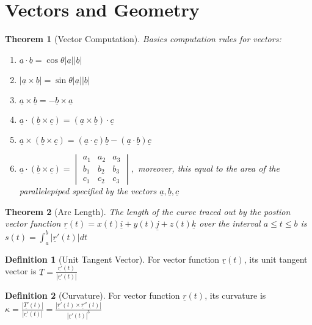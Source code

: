 \documentclass[9pt]{article}
\newtheorem{theorem}{Theorem}[subsection]
\theoremstyle{definition}
\newtheorem{definition}{Definition}[section]
\theoremstyle{remark}
\begin{document}
\section{Vectors and Geometry}

\begin{theorem}[Vector Computation]
Basics computation rules for vectors:
	\begin{enumerate}
		\item $\underline{a} \cdot \underline{b} = \cos{\theta}  | \underline{a}| | \underline{b}| $
		\item $| \underline{a} \times \underline{b} | = \sin{\theta}  | \underline{a}| | \underline{b}| $
		\item $ \underline{a} \times \underline{b} = - \underline{b} \times \underline{a} $
		\item $ \underline{a} \cdot (\underline{b} \times \underline{c}) = ( \underline{a}\times \underline{b}) \cdot \underline{c} $
		\item $ \underline{a} \times (\underline{b} \times \underline{c}) = (\underline{a} \cdot \underline{c}) \underline{b} - (\underline{a} \cdot \underline{b}) \underline{c} $
		\item $ \underline{a} \cdot ( \underline{b} \times \underline{c}) = \begin{vmatrix}
			a_1 & a_2 & a_3 \\
			b_1 & b_2 & b_3 \\
			c_1 & c_2 & c_3
			\end{vmatrix}, $ moreover, this equal to the area of the parallelepiped specified by the vectors $ \underline{a}, \underline{b}, \underline{c} $
 	\end{enumerate}
\end{theorem}

\begin{theorem}[Arc Length]
	The length of the curve traced out by the postion vector function $ \underline{r}(t)=x(t) \underline{i} + y(t) \underline{j} + z(t) \underline{k} $ over the interval $ a \leq t \leq b$ is 
$
s(t)= \int_a^b | \underline{r}'(t) | dt
$

\end{theorem}
\begin{definition}[Unit Tangent Vector]
	
	For vector function $ \underline{r}(t) $, its unit tangent vector is $ \underline{T} =\frac{ \underline{r'}(t)}{| \underline{r'}(t)|} $
\end{definition}

\begin{definition}[Curvature]
	For vector function $ \underline{r}(t) $, its curvature is
	$\kappa  = \frac{| \underline{T'}(t)|}{| \underline{r'}(t)|}= \frac{ |\underline{r}'(t) \times \underline{r}''(t)|}{| \underline{r}'(t)|^3} $
	
\end{definition}
\end{document}

